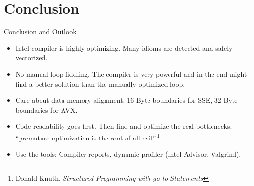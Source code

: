 \section{Conclusion}
\begin{frame}{Conclusion and Outlook}
\begin{itemize}
\item Intel compiler is highly optimizing. Many idioms are detected and safely vectorized.
\item No manual loop fiddling. The compiler is very powerful and in the end might find a better solution than the manually optimized loop.
\item Care about data memory alignment. 16 Byte boundaries for SSE, 32 Byte boundaries for AVX.
\item Code readability goes first. Then find and optimize the real bottlenecks. \enquote{premature optimization is the root of all evil}.\footnote{Donald Knuth, \textit{Structured Programming with go to Statements}}
\item Use the tools: Compiler reports, dynamic profiler (Intel Advisor, Valgrind).
\end{itemize}
\end{frame}
